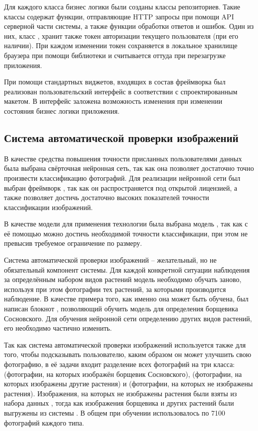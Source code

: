 \tab
Для каждого класса бизнес логики были созданы классы репозиториев.
Такие классы содержат функции, отправляющие HTTP запросы при помощи API серверной части системы, а также функции обработки ответов и ошибок.
Один из них, класс , хранит также токен авторизации текущего пользователя (при его наличии).
При каждом изменении токен сохраняется в локальное хранилище браузера при помощи библиотеки  и считывается оттуда при перезагрузке приложения.

\tab
При помощи стандартных виджетов, входящих в состав фреймворка  был реализован пользовательский интерфейс в соответствии с спроектированным макетом.
В интерфейс заложена возможность изменения при изменении состояния бизнес логики приложения.

\subsection{Система автоматической проверки изображений}

\tab
В качестве средства повышения точности присланных пользователями данных была выбрана свёрточная нейронная сеть\cite{convolutional-better}, так как она позволяет достаточно точно произвести классификацию фотографий.
Для реализации нейронной сети был выбран фреймворк \cite{tensorflow-better}, так как он распространяется под открытой лицензией, а также позволяет достичь достаточно высоких показателей точности классификации изображений.

\tab
В качестве модели для применения технологии  была выбрана модель \cite{xception-better}, так как с её помощью можно достичь необходимой точности классификации, при этом не превысив требуемое ограничение по размеру.

\tab
Система автоматической проверки изображений -- желательный, но не обязательный компонент системы.
Для каждой конкретной ситуации наблюдения за определённым набором видов растений модель необходимо обучать заново, используя при этом фотографии тех растений, за которыми производится наблюдение.
В качестве примера того, как именно она может быть обучена, был написан блокнот , позволяющий обучить модель для определения борщевика Сосновского.
Для обучения нейронной сети определению других видов растений, его необходимо частично изменить. 

\tab
Так как система автоматической проверки изображений используется также для того, чтобы подсказывать пользователю, каким образом он может улучшить свою фотографию, в её задачи входит разделение всех фотографий на три класса:  (фотографии, на которых изображён борщевик Сосновского),  (фотографии, на которых изображены другие растения) и  (фотографии, на которых не изображены растения).
Изображения, на которых не изображены растения были взяты из набора данных \cite{???}, тогда как изображения борщевика и других растений были выгружены из системы \cite{inaturalist}.
В общем при обучении использовалось по 7100 фотографий каждого типа.

